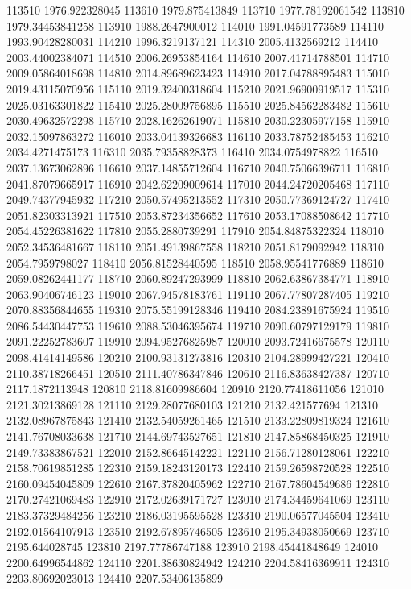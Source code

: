 {113510 1976.922328045
113610 1979.875413849
113710 1977.78192061542
113810 1979.34453841258
113910 1988.2647900012
114010 1991.04591773589
114110 1993.90428280031
114210 1996.3219137121
114310 2005.4132569212
114410 2003.44002384071
114510 2006.26953854164
114610 2007.41714788501
114710 2009.05864018698
114810 2014.89689623423
114910 2017.04788895483
115010 2019.43115070956
115110 2019.32400318604
115210 2021.96900919517
115310 2025.03163301822
115410 2025.28009756895
115510 2025.84562283482
115610 2030.49632572298
115710 2028.16262619071
115810 2030.22305977158
115910 2032.15097863272
116010 2033.04139326683
116110 2033.78752485453
116210 2034.4271475173
116310 2035.79358828373
116410 2034.0754978822
116510 2037.13673062896
116610 2037.14855712604
116710 2040.75066396711
116810 2041.87079665917
116910 2042.62209009614
117010 2044.24720205468
117110 2049.74377945932
117210 2050.57495213552
117310 2050.77369124727
117410 2051.82303313921
117510 2053.87234356652
117610 2053.17088508642
117710 2054.45226381622
117810 2055.2880739291
117910 2054.84875322324
118010 2052.34536481667
118110 2051.49139867558
118210 2051.8179092942
118310 2054.7959798027
118410 2056.81528440595
118510 2058.95541776889
118610 2059.08262441177
118710 2060.89247293999
118810 2062.63867384771
118910 2063.90406746123
119010 2067.94578183761
119110 2067.77807287405
119210 2070.88356844655
119310 2075.55199128346
119410 2084.23891675924
119510 2086.54430447753
119610 2088.53046395674
119710 2090.60797129179
119810 2091.22252783607
119910 2094.95276825987
120010 2093.72416675578
120110 2098.41414149586
120210 2100.93131273816
120310 2104.28999427221
120410 2110.38718266451
120510 2111.40786347846
120610 2116.83638427387
120710 2117.1872113948
120810 2118.81609986604
120910 2120.77418611056
121010 2121.30213869128
121110 2129.28077680103
121210 2132.421577694
121310 2132.08967875843
121410 2132.54059261465
121510 2133.22809819324
121610 2141.76708033638
121710 2144.69743527651
121810 2147.85868450325
121910 2149.73383867521
122010 2152.86645142221
122110 2156.71280128061
122210 2158.70619851285
122310 2159.18243120173
122410 2159.26598720528
122510 2160.09454045809
122610 2167.37820405962
122710 2167.78604549686
122810 2170.27421069483
122910 2172.02639171727
123010 2174.34459641069
123110 2183.37329484256
123210 2186.03195595528
123310 2190.06577045504
123410 2192.01564107913
123510 2192.67895746505
123610 2195.34938050669
123710 2195.644028745
123810 2197.77786747188
123910 2198.45441848649
124010 2200.64996544862
124110 2201.38630824942
124210 2204.58416369911
124310 2203.80692023013
124410 2207.53406135899
}
